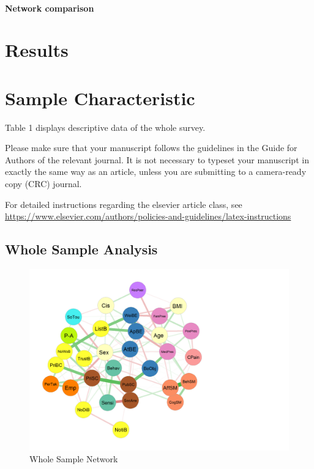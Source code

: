\documentclass[preprint, 3p,
authoryear]{elsarticle} %
\begin{document}
\hypertarget{network-comparison}{%
\paragraph{Network comparison}\label{network-comparison}}

\hypertarget{results}{%
\section{Results}\label{results}}

\hypertarget{sample-characteristic}{%
\section{Sample Characteristic}\label{sample-characteristic}}

Table 1 displays descriptive data of the whole survey.

Please make sure that your manuscript follows the guidelines in the
Guide for Authors of the relevant journal. It is not necessary to
typeset your manuscript in exactly the same way as an article, unless
you are submitting to a camera-ready copy (CRC) journal.

For detailed instructions regarding the elsevier article class, see
\url{https://www.elsevier.com/authors/policies-and-guidelines/latex-instructions}

\hypertarget{whole-sample-analysis}{%
\subsection{Whole Sample Analysis}\label{whole-sample-analysis}}

\begin{figure}[H]

{\centering \includegraphics[width=1\linewidth,]{../Figures_Quest/Network_Whole_imputed} 

}

\caption{\label{Whole Sample} Whole Sample Network}\label{fig:unnamed-chunk-3}
\end{figure}
\end{document}
